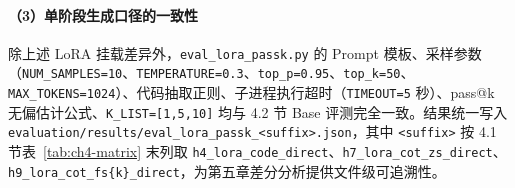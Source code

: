 \paragraph{（3）单阶段生成口径的一致性}
除上述 LoRA 挂载差异外，\texttt{eval\_lora\_passk.py} 的 Prompt 模板、采样参数（\texttt{NUM\_SAMPLES=10}、\texttt{TEMPERATURE=0.3}、\texttt{top\_p=0.95}、\texttt{top\_k=50}、\texttt{MAX\_TOKENS=1024}）、代码抽取正则、子进程执行超时（\texttt{TIMEOUT=5} 秒）、pass@k 无偏估计公式、\texttt{K\_LIST=[1,5,10]} 均与 4.2 节 Base 评测完全一致。结果统一写入 \texttt{evaluation/results/eval\_lora\_passk\_<suffix>.json}，其中 \texttt{<suffix>} 按 4.1 节表~\ref{tab:ch4-matrix} 末列取 \texttt{h4\_lora\_code\_direct}、\texttt{h7\_lora\_cot\_zs\_direct}、\texttt{h9\_lora\_cot\_fs\{k\}\_direct}，为第五章差分分析提供文件级可追溯性。
